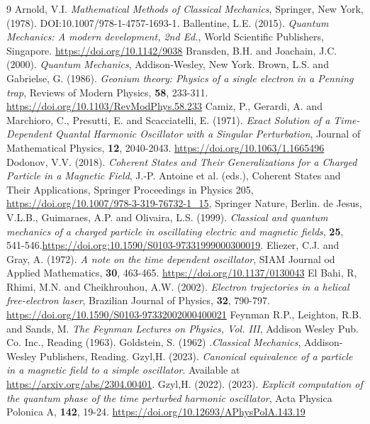 \documentclass[12pt]{article}
\numberwithin{equation}{section}
\begin{document}
\begin{thebibliography}{9}
 Arnold, V.I. {\it Mathematical Methods of Classical Mechanics}, Springer, New York, (1978). DOI:10.1007/978-1-4757-1693-1.
 Ballentine, L.E. (2015). {\it Quantum Mechanics: A modern development, 2nd Ed.}, World Scientific Publishers, Singapore. \url{https://doi.org/10.1142/9038}  
 Bransden, B.H. and Joachain, J.C. (2000). {\it Quantum Mechanics}, Addison-Wesley, New York.
 Brown, L.S. and Gabrielse, G. (1986). {\it Geonium theory: Physics of a single electron in a Penning trap}, Reviews of Modern Physics, \textbf{58}, 233-311. \url{https://doi.org/10.1103/RevModPhys.58.233}
 Camiz, P., Gerardi, A. and Marchioro, C., Presutti, E. and Scacciatelli, E. (1971). {\it Exact Solution of a Time-Dependent Quantal Harmonic Oscillator with a Singular Perturbation}, Journal of Mathematical Physics, \textbf{12}, 2040-2043. \url{
https://doi.org/10.1063/1.1665496}
 Dodonov, V.V. (2018). {\it Coherent States and Their Generalizations for a Charged Particle in a Magnetic Field}, J.-P. Antoine et al. (eds.), Coherent States and Their Applications, Springer Proceedings in Physics 205, \url{https://doi.org/10.1007/978-3-319-76732-1_15}, Springer Nature, Berlin.
 de Jesus, V.L.B., Guimaraes, A.P. and Olivaira, L.S. (1999). {\it Classical and quantum mechanics of a charged particle in oscillating electric and magnetic fields}, \textbf{25}, 541-546.\url{https://doi.org:10.1590/S0103-97331999000300019}.
 Eliezer, C.J. and Gray, A. (1972). {\it A note on the time dependent oscillator}, SIAM Journal od Applied Mathematics, \textbf{30}, 463-465. \url{https://doi.org/10.1137/0130043}
 El Bahi, R, Rhimi, M.N. and Cheikhrouhou, A.W.  (2002). {\it Electron trajectories in a helical free-electron laser}, Brazilian Journal of Physics, \textbf{32}, 790-797. \url{https://doi.org/10.1590/S0103-97332002000400021}
 Feynman R.P., Leighton, R.B. and Sands, M. {\it The Feynman Lectures on Physics, Vol. III}, Addison Wesley Pub. Co. Inc., Reading (1963).
 Goldstein, S. (1962) .{\it Classical Mechanics}, Addison-Wesley Publishers, Reading. 
 Gzyl,H. (2023). {\it Canonical equivalence of a particle in a magnetic field to a simple oscillator}. Available at \url{https://arxiv.org/abs/2304.00401}.
 Gzyl,H. (2022).  (2023). {\it Explicit computation of the quantum phase of the time perturbed harmonic oscillator}, Acta Physica Polonica A, \textbf{142}, 19-24. \url{https://doi.org/10.12693/APhysPolA.143.19}

\end{thebibliography}
\end{document}
